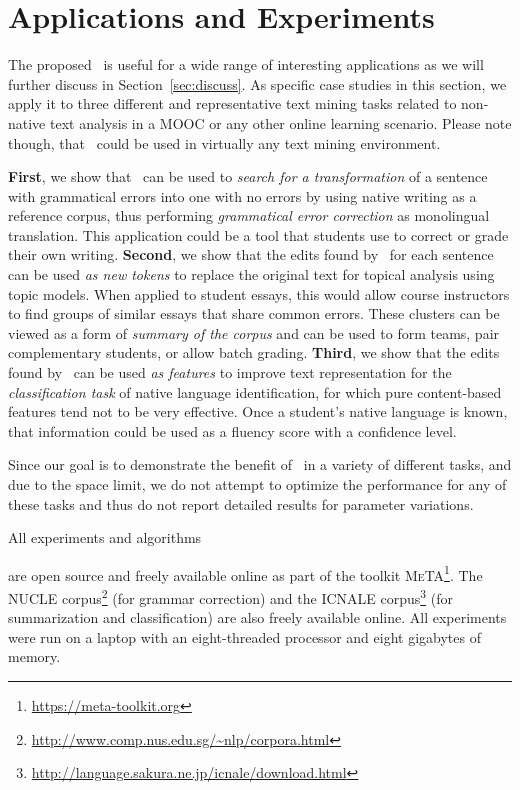 \section{Applications and Experiments}
\label{sec:experiments}

The proposed \sd~is useful for a wide range of interesting applications as we
will further discuss in Section~\ref{sec:discuss}.  As specific case studies in
this section, we apply it to three different and representative text mining
tasks related to non-native text analysis in a MOOC or any other online learning
scenario. Please note though, that \sd~could be used in virtually any text
mining environment.

{\bf First}, we show that \sd~can be used to {\em search for a transformation}
of a sentence with grammatical errors  into one with no errors by using native
writing as a reference corpus, thus performing {\em grammatical error
correction} as monolingual translation. This application could be a tool that
students use to correct or grade their own writing. {\bf Second}, we show that
the edits found by \sd~for each sentence can be used {\em as new tokens} to
replace the original text for topical analysis using topic models. When applied
to student essays, this would allow course instructors to find groups of similar
essays that share common errors. These clusters can be viewed as a form of {\em
summary of the corpus} and can be used to form teams, pair complementary
students, or allow batch grading. {\bf Third}, we show that the edits found by
\sd~can be used {\em as features} to improve text representation for the {\em
classification task} of native language identification, for which pure
content-based features tend not to be very effective. Once a student's native
language is known, that information could be used as a fluency score with a
confidence level.

Since our goal is to demonstrate the benefit of \sd~in a variety of different
tasks, and due to the space limit, we do not attempt to optimize the performance
for any of these tasks and thus do not report detailed results for parameter
variations.

All experiments and algorithms  are open source and
freely available online as part of the toolkit
\textsc{MeTA}\footnote{\url{https://meta-toolkit.org}}. The NUCLE
corpus\footnote{\url{http://www.comp.nus.edu.sg/~nlp/corpora.html}} (for grammar
correction) and the ICNALE
corpus\footnote{\url{http://language.sakura.ne.jp/icnale/download.html}} (for
summarization and classification) are also freely available online. All
experiments were run on a laptop with an eight-threaded processor and eight
gigabytes of memory.

